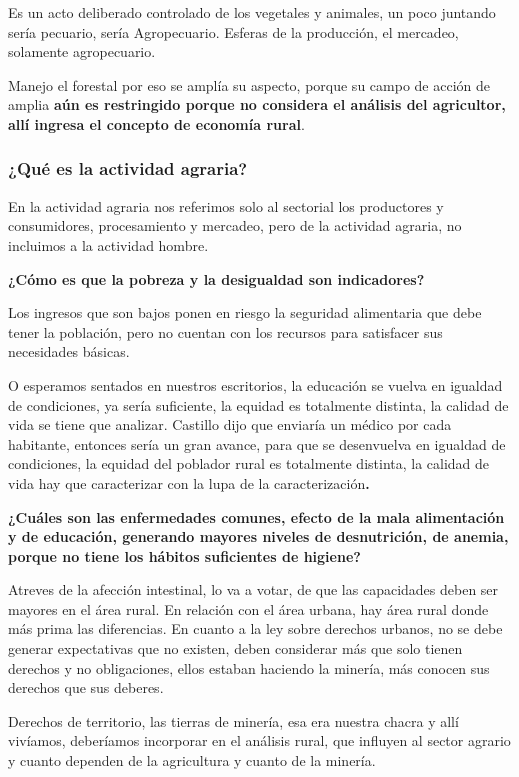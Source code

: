 \documentclass[
  a4paper,
]{article}
\begin{document}
Es un acto deliberado controlado de los vegetales y animales, un poco
juntando sería pecuario, sería Agropecuario. Esferas de la producción,
el mercadeo, solamente agropecuario.

Manejo el forestal por eso se amplía su aspecto, porque su campo de
acción de amplia \textbf{aún es restringido porque no considera el
análisis del agricultor, allí ingresa el concepto de economía rural}.

\hypertarget{quuxe9-es-la-actividad-agraria}{%
\subsubsection{¿Qué es la actividad
agraria?}\label{quuxe9-es-la-actividad-agraria}}

En la actividad agraria nos referimos solo al sectorial los productores
y consumidores, procesamiento y mercadeo, pero de la actividad agraria,
no incluimos a la actividad hombre.

\textbf{¿Cómo es que la pobreza y la desigualdad son indicadores?}

Los ingresos que son bajos ponen en riesgo la seguridad alimentaria que
debe tener la población, pero no cuentan con los recursos para
satisfacer sus necesidades básicas.

O esperamos sentados en nuestros escritorios, la educación se vuelva en
igualdad de condiciones, ya sería suficiente, la equidad es totalmente
distinta, la calidad de vida se tiene que analizar. Castillo dijo que
enviaría un médico por cada habitante, entonces sería un gran avance,
para que se desenvuelva en igualdad de condiciones, la equidad del
poblador rural es totalmente distinta, la calidad de vida hay que
caracterizar con la lupa de la caracterización\textbf{.}

\textbf{¿Cuáles son las enfermedades comunes, efecto de la mala
alimentación y de educación, generando mayores niveles de desnutrición,
de anemia, porque no tiene los hábitos suficientes de higiene?}

Atreves de la afección intestinal, lo va a votar, de que las capacidades
deben ser mayores en el área rural. En relación con el área urbana, hay
área rural donde más prima las diferencias. En cuanto a la ley sobre
derechos urbanos, no se debe generar expectativas que no existen, deben
considerar más que solo tienen derechos y no obligaciones, ellos estaban
haciendo la minería, más conocen sus derechos que sus deberes.

Derechos de territorio, las tierras de minería, esa era nuestra chacra y
allí vivíamos, deberíamos incorporar en el análisis rural, que influyen
al sector agrario y cuanto dependen de la agricultura y cuanto de la
minería.
\end{document}
